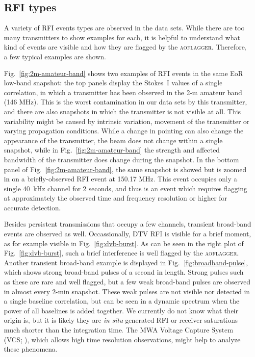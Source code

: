 \documentclass{pasa}
\begin{document}
\subsection{RFI types}
A variety of RFI events types are observed in the data sets. While there are too many transmitters to show examples for each, it is helpful to understand what kind of events are visible and how they are flagged by the \textsc{aoflagger}. Therefore, a few typical examples are shown.

Fig.~\ref{fig:2m-amateur-band} shows two examples of RFI events in the same EoR low-band snapshot: the top panels display the Stokes~I values of a single correlation, in which a transmitter has been observed in the 2-m amateur band (146 MHz). This is the worst contamination in our data sets by this transmitter, and there are also snapshots in which the transmitter is not visible at all. This variability might be caused by intrinsic variation, movement of the transmitter or varying propagation conditions. While a change in pointing can also change the appearance of the transmitter, the beam does not change within a single snapshot, while in Fig.~\ref{fig:2m-amateur-band} the strength and affected bandwidth of the transmitter does change during the snapshot. In the bottom panel of Fig.~\ref{fig:2m-amateur-band}, the same snapshot is showed but is zoomed in on a briefly-observed RFI event at 150.17 MHz. This event occupies only a single 40~kHz channel for 2 seconds, and thus is an event which requires flagging at approximately the observed time and frequency resolution or higher for accurate detection.

Besides persistent transmissions that occupy a few channels, transient broad-band events are observed as well. Occassionally, DTV RFI is visible for a brief moment, as for example visible in Fig.~\ref{fig:dvb-burst}. As can be seen in the right plot of Fig.~\ref{fig:dvb-burst}, such a brief interference is well flagged by the \textsc{aoflagger}. Another transient broad-band example is displayed in Fig.~\ref{fig:broadband-pulse}, which shows strong broad-band pulses of a second in length. Strong pulses such as these are rare and well flagged, but a few weak broad-band pulses are observed in almost every 2-min snapshot. These weak pulses are not visible nor detected in a single baseline correlation, but can be seen in a dynamic spectrum when the power of all baselines is added together. We currently do not know what their origin is, but it is likely they are \textit{in situ} generated RFI or receiver saturations much shorter than the integration time. The MWA Voltage Capture System (VCS; \citealt{mwa-voltage-capture-2014}), which allows high time resolution observations, might help to analyze these phenomena.
\end{document}
